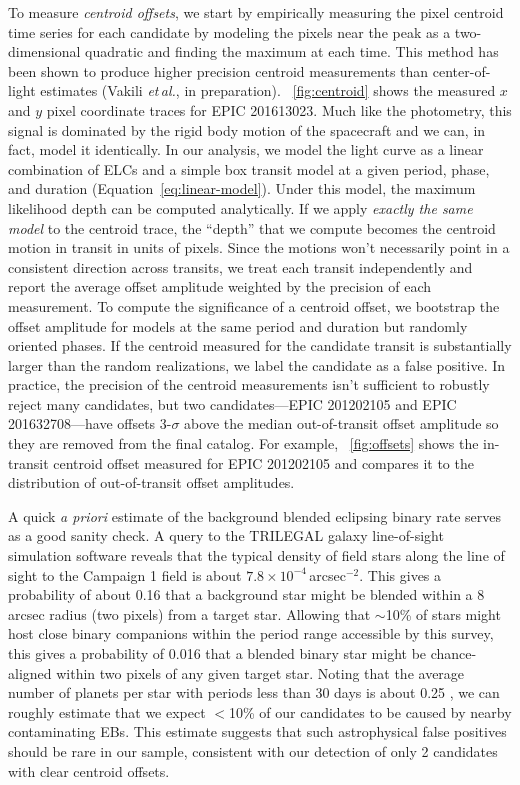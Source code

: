 \documentclass[12pt,preprint]{aastex}
\newcommand{\foreign}[1]{\emph{#1}}
\newcommand{\etal}{\foreign{et\,al.}}
\newcommand{\figref}[1]{\ref{fig:#1}}
\newcommand{\Fig}[1]{\figurename~\figref{#1}}
\newcommand{\eqalt}[1]{Equation~\ref{eq:#1}}
\begin{document}
To measure \emph{centroid offsets}, we start by empirically measuring the
pixel centroid time series for each candidate by modeling the pixels near the
peak as a two-dimensional quadratic and finding the maximum at each time.
This method has been shown to produce higher precision centroid measurements
than center-of-light estimates (Vakili \etal, in preparation).
\Fig{centroid} shows the measured $x$ and $y$ pixel coordinate traces for EPIC
201613023.
Much like the photometry, this signal is dominated by the rigid body motion
of the spacecraft and we can, in fact, model it identically.
In our analysis, we model the light curve as a linear
combination of ELCs and a simple box transit model at a given period, phase,
and duration (\eqalt{linear-model}).
Under this model, the maximum likelihood depth can be computed analytically.
If we apply \emph{exactly the same model} to the centroid trace, the ``depth''
that we compute becomes the centroid motion in transit in units of pixels.
Since the motions won't necessarily point in a consistent direction across
transits, we treat each transit independently and report the average offset
amplitude weighted by the precision of each measurement.
To compute the significance of a centroid offset, we bootstrap the offset
amplitude for models at the same period and duration but randomly oriented
phases.
If the centroid measured for the candidate transit is substantially larger
than the random realizations, we label the candidate as a false positive.
In practice, the precision of the centroid measurements isn't sufficient to
robustly reject many candidates, but two candidates---EPIC 201202105 and EPIC
201632708---have offsets 3-$\sigma$ above the median out-of-transit offset
amplitude so they are removed from the final catalog.
For example, \Fig{offsets} shows the in-transit centroid offset measured for
EPIC 201202105 and compares it to the distribution of out-of-transit offset
amplitudes.

A quick \emph{a priori} estimate of the background blended eclipsing
binary rate serves as a good sanity check.  A query to the TRILEGAL
\citep[TRIdimensional modeL of thE GALaxy,][]{Girardi:2005} galaxy
line-of-sight simulation software reveals that the typical density of
field stars along the line of sight to the Campaign 1 field is about
$7.8\times 10^{-4}$\,arcsec$^{-2}$.  This gives a probability of about
0.16 that a background star might be blended within a 8\,arcsec radius
(two pixels) from a target star.  Allowing that $\sim$10\% of stars
might host close binary companions within the period range accessible
by this survey, this gives a probability of 0.016 that a blended
binary star might be chance-aligned within two pixels of any given
target star.  Noting that the average number of planets per star with
periods less than 30 days is about 0.25 \citep{Fressin:2013}, we can
roughly estimate that we expect $<$10\% of our candidates to be caused
by nearby contaminating EBs.  This estimate suggests that such
astrophysical false positives should be rare in our sample, consistent
with our detection of only 2 candidates with clear centroid offsets.
\end{document}
